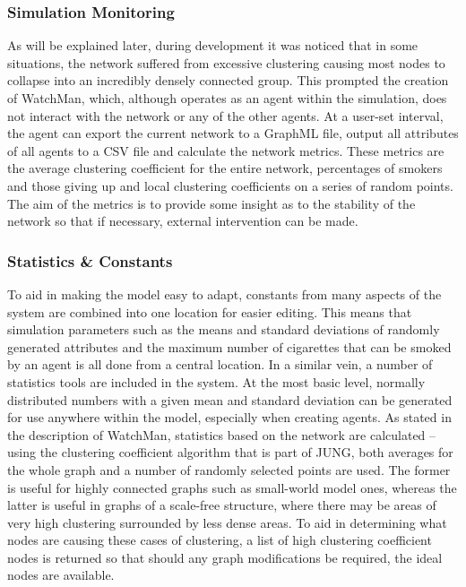 \documentclass[]{report}
\begin{document}
\subsubsection{Simulation Monitoring}
As will be explained later, during development it was noticed that in some situations, the network suffered from excessive clustering causing most nodes to collapse into an incredibly densely connected group. This prompted the creation of WatchMan, which, although operates as an agent within the simulation, does not interact with the network or any of the other agents. At a user-set interval, the agent can export the current network to a GraphML file, output all attributes of all agents to a CSV file and calculate the network metrics. These metrics are the average clustering coefficient for the entire network, percentages of smokers and those giving up and local clustering coefficients on a series of random points. The aim of the metrics is to provide some insight as to the stability of the network so that if necessary, external intervention can be made. 

\subsubsection{Statistics \& Constants}
To aid in making the model easy to adapt, constants from many aspects of the system are combined into one location for easier editing. This means that simulation parameters such as the means and standard deviations of randomly generated attributes and the maximum number of cigarettes that can be smoked by an agent is all done from a central location. In a similar vein, a number of statistics tools are included in the system. At the most basic level, normally distributed numbers with a given mean and standard deviation can be generated for use anywhere within the model, especially when creating agents. 
As stated in the description of WatchMan, statistics based on the network are calculated – using the clustering coefficient algorithm that is part of JUNG, both averages for the whole graph and a number of randomly selected points are used. The former is useful for highly connected graphs such as small-world model ones, whereas the latter is useful in graphs of a scale-free structure, where there may be areas of very high clustering surrounded by less dense areas. To aid in determining what nodes are causing these cases of clustering, a list of high clustering coefficient nodes is returned so that should any graph modifications be required, the ideal nodes are available.
\end{document}

